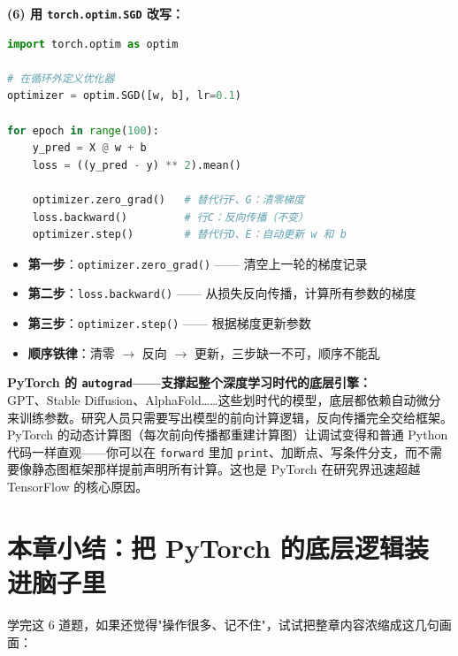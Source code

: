 \documentclass[a4paper,11pt]{ctexart}
\begin{document}
\begin{solutionbox}[参考答案与详细解析]
    \textbf{(6) 用 \texttt{torch.optim.SGD} 改写：}

    \begin{lstlisting}[language=Python]
import torch.optim as optim

# 在循环外定义优化器
optimizer = optim.SGD([w, b], lr=0.1)

for epoch in range(100):
    y_pred = X @ w + b
    loss = ((y_pred - y) ** 2).mean()

    optimizer.zero_grad()   # 替代行F、G：清零梯度
    loss.backward()         # 行C：反向传播（不变）
    optimizer.step()        # 替代行D、E：自动更新 w 和 b
    \end{lstlisting}

    \begin{keybox}
        \begin{itemize}
            \item \textbf{第一步}：\texttt{optimizer.zero\_grad()} —— 清空上一轮的梯度记录
            \item \textbf{第二步}：\texttt{loss.backward()} —— 从损失反向传播，计算所有参数的梯度
            \item \textbf{第三步}：\texttt{optimizer.step()} —— 根据梯度更新参数
            \item \textbf{顺序铁律}：清零 $\to$ 反向 $\to$ 更新，三步缺一不可，顺序不能乱
        \end{itemize}
    \end{keybox}
\end{solutionbox}

\begin{appbox}[现实应用场景]
    \textbf{PyTorch 的 \texttt{autograd}——支撑起整个深度学习时代的底层引擎：}\\
    GPT、Stable Diffusion、AlphaFold……这些划时代的模型，底层都依赖自动微分来训练参数。研究人员只需要写出模型的前向计算逻辑，反向传播完全交给框架。PyTorch 的动态计算图（每次前向传播都重建计算图）让调试变得和普通 Python 代码一样直观——你可以在 \texttt{forward} 里加 \texttt{print}、加断点、写条件分支，而不需要像静态图框架那样提前声明所有计算。这也是 PyTorch 在研究界迅速超越 TensorFlow 的核心原因。
\end{appbox}

\section{本章小结：把 PyTorch 的底层逻辑装进脑子里}

学完这 6 道题，如果还觉得"操作很多、记不住"，试试把整章内容浓缩成这几句画面：
\end{document}
